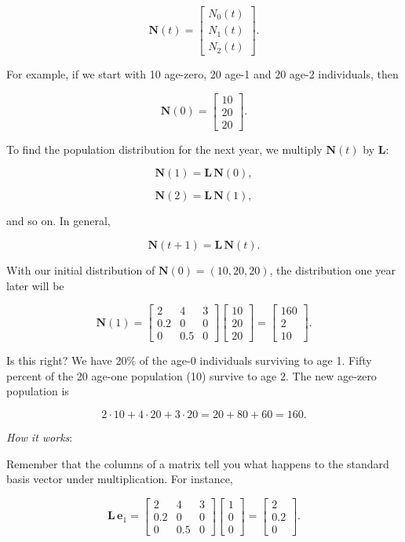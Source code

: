\documentclass[
]{book}
\theoremstyle{definition}
\theoremstyle{definition}
\theoremstyle{definition}
\theoremstyle{definition}
\theoremstyle{remark}
\begin{document}
\[\mathbf{N}(t)=\begin{bmatrix}N_0(t)\\N_1(t)\\N_2(t)\end{bmatrix}.\]

For example, if we start with 10 age-zero, 20 age-1 and 20 age-2 individuals, then

\[\mathbf{N}(0)=\begin{bmatrix}10\\20\\20\end{bmatrix}.\]

To find the population distribution for the next year, we multiply \(\mathbf{N}(t)\) by \(\mathbf{L}\):

\[\mathbf{N}(1)=\mathbf{L}\,\mathbf{N}(0),\]

\[\mathbf{N}(2)=\mathbf{L}\,\mathbf{N}(1),\]

and so on. In general,

\[\mathbf{N}(t+1)=\mathbf{L}\,\mathbf{N}(t).\]

With our initial distribution of \(\mathbf{N}(0)=(10,20,20)\), the distribution one year later will be

\[\mathbf{N}(1)=\begin{bmatrix}2 & 4 & 3\\
0.2 & 0 & 0\\0 & 0.5 & 0\end{bmatrix}\begin{bmatrix}10\\20\\20\end{bmatrix}=\begin{bmatrix}160\\2\\10\end{bmatrix}.\]

Is this right? We have 20\% of the age-0 individuals surviving to age 1. Fifty percent of the 20 age-one population (10) survive to age 2. The new age-zero population is

\[2\cdot 10+4\cdot 20+3\cdot 20=20+80+60=160.\]

\emph{How it works}:

Remember that the columns of a matrix tell you what happens to the standard basis vector under multiplication. For instance,

\[\mathbf{L}\,\mathbf{e}_1=\begin{bmatrix}2&4&3\\0.2&0 & 0\\0 & 0.5 & 0\end{bmatrix}\begin{bmatrix}1\\0\\0\end{bmatrix}=\begin{bmatrix}2\\0.2\\0\end{bmatrix}.\]
\end{document}
